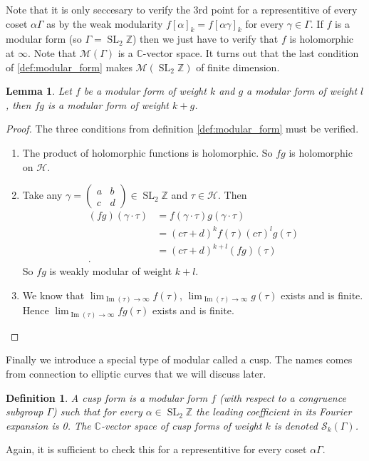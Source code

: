 \documentclass[a4paper]{article}
\theoremstyle{theoremdd}
\newtheorem{lemma}[theorem]{Lemma}
\theoremstyle{definitiondd}
\newtheorem{definition}[theorem]{Definition}
\theoremstyle{remarkdd}
\newcommand{\Z}{\mathbb{Z}}
\newcommand{\C}{\mathbb{C}}
\DeclareMathOperator{\im}{Im}
\DeclareMathOperator{\SL}{SL}
\begin{document}
Note that it is only seccesary to verify the 3rd point for a representitive of every coset $\alpha \Gamma$ as by the weak modularity  $f[\alpha]_k = f[\alpha \gamma]_k$ for every  $\gamma \in \Gamma$. 
If  $f$ is a modular form (so $\Gamma = \SL_2\Z$) then we just have to verify that $f$ is holomorphic at $\infty$.
Note that $\mathcal{M}(\Gamma)$ is a $\C$-vector space. 
It turns out that the last condition of \cref{def:modular_form} makes $\mathcal{M} (\SL_2\Z)$ of finite dimension.  
\begin{lemma}\label{lem:product_modular_forms}
	Let $f$ be a modular form of weight $k$ and $g$ a modular form of weight $l$, then 
	$fg$ is a modular form of weight  $k + g$.
\end{lemma}
\begin{proof}
	The three conditions from definition \ref{def:modular_form} must be verified. 
	\begin{enumerate}
		\item The product of holomorphic functions is holomorphic. So $ fg$ is holomorphic on $\mathcal{H} $. 
		\item Take any  $\gamma = \begin{pmatrix} a & b \\ c & d \end{pmatrix} \in \SL_2\Z$ and $\tau \in \mathcal{H} $. Then 
			\begin{align*}
				(fg)(\gamma \cdot \tau) &= f(\gamma \cdot \tau) g(\gamma \cdot \tau)   \\
							&= (c\tau + d)^{k} f(\tau) (c \tau)^{l} g(\tau) \\
							&= (c\tau + d)^{k+l} (fg)(\tau) \\
			.\end{align*}
			So $fg$ is weakly modular of weight $k+l$. 
		\item We know that $\lim_{\im(\tau) \to \infty} f(\tau)$, $\lim_{\im(\tau) \to \infty} g(\tau)$ exists and is finite. Hence $\lim_{\im(\tau) \to \infty} fg (\tau)$ exists and is finite.		
	\end{enumerate}
\end{proof}

Finally we introduce a special type of modular called a cusp. The names comes from connection to elliptic curves  that we will discuss later.
\begin{definition}\label{def:cusp}
	A \emph{cusp form} is a modular form $f$ (with respect to a congruence subgroup  $\Gamma$) such that for every  $\alpha \in \SL_2\Z$  the leading coefficient in its Fourier expansion is 0. 
	 The $\C$-vector space of cusp forms of weight $k$ is denoted $\mathcal{S} _k(\Gamma)$.
\end{definition}
Again, it is sufficient to check this for a representitive for every coset $\alpha \Gamma$.
\end{document}
